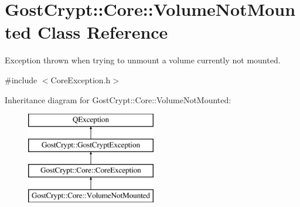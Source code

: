 \hypertarget{class_gost_crypt_1_1_core_1_1_volume_not_mounted}{}\section{Gost\+Crypt\+:\+:Core\+:\+:Volume\+Not\+Mounted Class Reference}
\label{class_gost_crypt_1_1_core_1_1_volume_not_mounted}


Exception thrown when trying to unmount a volume currently not mounted.  




{\ttfamily \#include $<$Core\+Exception.\+h$>$}

Inheritance diagram for Gost\+Crypt\+:\+:Core\+:\+:Volume\+Not\+Mounted\+:\begin{figure}[H]
\begin{center}
\leavevmode
\includegraphics[height=4.000000cm]{class_gost_crypt_1_1_core_1_1_volume_not_mounted}
\end{center}
\end{figure}
